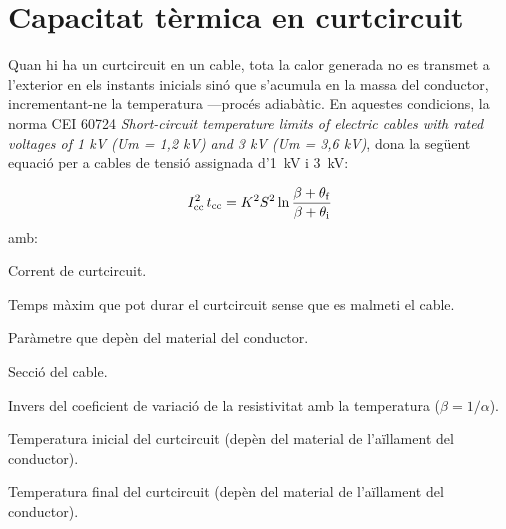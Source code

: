\section{Capacitat tèrmica en curtcircuit}\label{ces:cables_Icc_termica}

Quan hi ha un curtcircuit en un cable, tota la calor generada no es transmet a l'exterior en els instants inicials sinó que s'acumula en la massa del conductor, incrementant-ne la temperatura ---procés adiabàtic. En aquestes condicions, la norma CEI 60724 \textit{Short-circuit temperature limits of electric cables with rated voltages of 1 kV (Um = 1,2 kV) and 3 kV (Um = 3,6 kV)}, dona la següent equació per a cables de tensió assignada d'\qty{1}{kV} i \qty{3}{kV}:

\begin{equation}
   I_\mathrm{cc}^2 \,t_\mathrm{cc} = K^2 S^2 \ln \frac{\beta + \theta_\mathrm{f}}{\beta + \theta_\mathrm{i}}
\end{equation}
amb:

\begin{list}{}
   {\setlength{\labelwidth}{10mm} \setlength{\leftmargin}{12mm} \setlength{\labelsep}{2mm}}
   \item[\hspace{5mm}$I\ped{cc}$\hfill] Corrent de curtcircuit.
   \item[\hspace{5mm}$t\ped{cc}$\hfill] Temps màxim que pot durar el curtcircuit sense que es malmeti el cable.
   \item[\hspace{5mm}$K$\hfill] Paràmetre que depèn del material del conductor.
   \item[\hspace{5mm}$S$\hfill] Secció del cable.
   \item[\hspace{5mm}$\beta$\hfill] Invers del coeficient de variació de la resistivitat amb la temperatura ($\beta = 1/ \alpha$).
   \item[\hspace{5mm}$\theta\ped{i}$\hfill] Temperatura inicial del curtcircuit (depèn del material de l'aïllament del conductor).
   \item[\hspace{5mm}$\theta\ped{f}$\hfill] Temperatura final del curtcircuit (depèn del material de l'aïllament del conductor).
\end{list}

